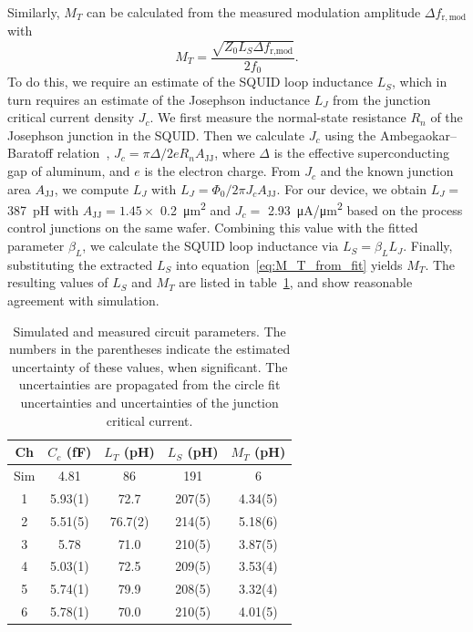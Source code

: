 \documentclass[10pt]{iopart}
\begin{document}
Similarly, $M_T$ can be calculated from the measured modulation amplitude $\Delta f_{\mathrm{r, mod}}$ with
\begin{equation} \label{eq:M_T_from_fit}
    M_T = \frac{\sqrt{Z_0 L_S \Delta f_{\text{r,mod}}}}{2f_0}.
\end{equation}
To do this, we require an estimate of the SQUID loop inductance $L_S$, which in turn requires an estimate of the Josephson inductance $L_J$ from the junction critical current density $J_c$. We first measure the normal-state resistance $R_n$ of the Josephson junction in the SQUID. Then we calculate $J_c$ using the Ambegaokar--Baratoff relation~\cite{ambegaokar_tunneling_1963}, $J_c = \pi \Delta/2 e R_n A_{\mathrm{JJ}}$, where $\Delta$ is the effective superconducting gap of aluminum, and $e$ is the electron charge. From $J_c$ and the known junction area $A_{\mathrm{JJ}}$, we compute $L_J$ with $L_J= \Phi_0/2\pi J_c A_\text{JJ}$. For our device, we obtain $L_J = $ \qty{387}{pH} with $A_{\mathrm{JJ}} = 1.45 \times$ \qty{0.2}{\um^2} and $J_c =$ \qty{2.93}{\uA/\um^2} based on the process control junctions on the same wafer. Combining this value with the fitted parameter $\beta_L$, we calculate the SQUID loop inductance via $L_S = \beta_L L_J$. Finally, substituting the extracted $L_S$ into equation~\eqref{eq:M_T_from_fit} yields $M_T$. The resulting values of $L_S$ and $M_T$ are listed in table~\ref{tab:circuit_params}, and show reasonable agreement with simulation.

\begin{table}[htb]
    \centering
    \begin{tabular}{c c c c c}
    \hline
         Ch & \small{$C_c$ (fF)} & \small{$L_T$ (pH)}& \small{$L_S$ (pH)} & \small{$M_T$ (pH)} \\
    \hline
    Sim & 4.81 & 86 & 191 & 6 \\
    \hline
    1 & 5.93(1) & 72.7 & 207(5) & 4.34(5) \\
    2 & 5.51(5) & 76.7(2) & 214(5) & 5.18(6) \\
    3 & 5.78 & 71.0 & 210(5) & 3.87(5) \\
    4 & 5.03(1) & 72.5 & 209(5) & 3.53(4) \\
    5 & 5.74(1) & 79.9 & 208(5) & 3.32(4) \\
    6 & 5.78(1) & 70.0 & 210(5) & 4.01(5) \\
    \hline
    \end{tabular}
    \caption{Simulated and measured circuit parameters. The numbers in the parentheses indicate the estimated uncertainty of these values, when significant. The uncertainties are propagated from the circle fit uncertainties and uncertainties of the junction critical current.}
    \label{tab:circuit_params}
\end{table}
\end{document}
